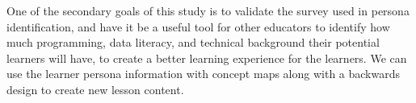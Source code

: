 \documentclass[020-persona\_validation.tex]{subfiles}
\begin{document}

    One of the secondary goals of this study is to validate the survey used in persona identification,
    and have it be a useful tool for other educators to identify how much
    programming, data literacy, and technical background their potential learners will have,
    to create a better learning experience for the learners.
    We can use the learner persona information with concept maps along with a backwards design
    to create new lesson content.


\end{document}
